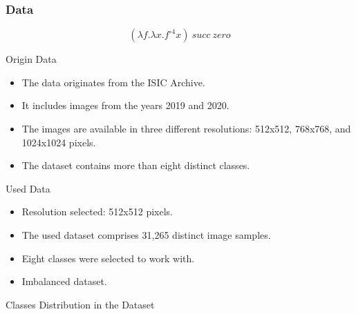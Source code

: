 \documentclass[dvipsnames,mathserif]{beamer}
\begin{document}
{    \begin{frame}
      \frametitle{Data}

      \[(\lambda f. \lambda x. f^{\circ 4} x)\ succ\ zero\]
    \end{frame}

    \begin{frame}

      \large Origin Data
      \vspace{0.25cm}

      \footnotesize

      \begin{itemize}
        \item The data originates from the ISIC Archive.
        \item It includes images from the years 2019 and 2020.
        \item The images are available in three different resolutions: 512x512,
          768x768, and 1024x1024 pixels.
        \item The dataset contains more than eight distinct classes.
      \end{itemize}

    \end{frame}


    \begin{frame}

      \large Used Data
      \vspace{0.25cm}

      \footnotesize

      \begin{itemize}
        \item Resolution selected: 512x512 pixels.
        \item The used dataset comprises 31,265 distinct image samples.
        \item Eight classes were selected to work with.
        \item Imbalanced dataset.
      \end{itemize}

    \end{frame}

    \begin{frame}

      \large Classes Distribution in the Dataset
      \vspace{0.25cm}


\end{frame}}
\end{document}
